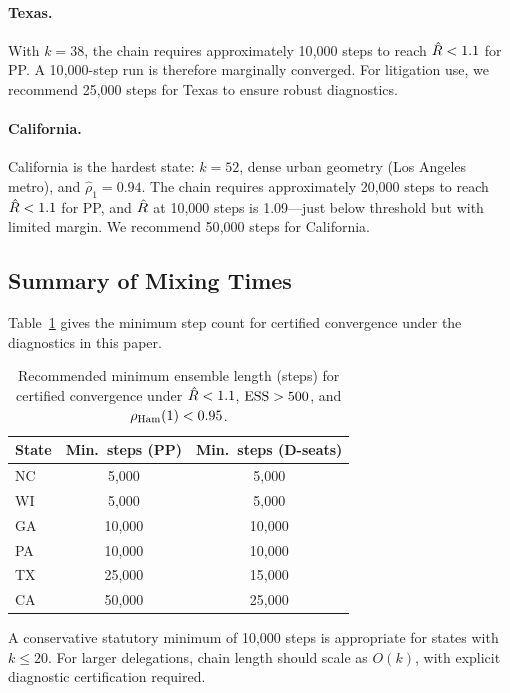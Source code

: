 \paragraph{Texas.}
With $k = 38$, the chain requires approximately 10{,}000 steps to reach
$\hat{R} < 1.1$ for PP.
A 10{,}000-step run is therefore marginally converged.
For litigation use, we recommend 25{,}000 steps for Texas to ensure
robust diagnostics.

\paragraph{California.}
California is the hardest state: $k = 52$, dense urban geometry
(Los Angeles metro), and $\hat{\rho}_1 = 0.94$.
The chain requires approximately 20{,}000 steps to reach $\hat{R} < 1.1$
for PP, and $\hat{R}$ at 10{,}000 steps is 1.09---just below threshold but
with limited margin.
We recommend 50{,}000 steps for California.

\subsection{Summary of Mixing Times}

Table~\ref{tab:mixing-times} gives the minimum step count for certified
convergence under the diagnostics in this paper.

\begin{table}[h]
\centering
\caption{Recommended minimum ensemble length (steps) for certified
         convergence under $\hat{R} < 1.1$, $\mathrm{ESS} > 500$, and $\rho_{\mathrm{Ham}}(1) < 0.95$.}
\label{tab:mixing-times}
\begin{tabular}{lcc}
\toprule
State & Min.\ steps (PP) & Min.\ steps (D-seats) \\
\midrule
NC &  5{,}000 &  5{,}000 \\
WI &  5{,}000 &  5{,}000 \\
GA & 10{,}000 & 10{,}000 \\
PA & 10{,}000 & 10{,}000 \\
TX & 25{,}000 & 15{,}000 \\
CA & 50{,}000 & 25{,}000 \\
\bottomrule
\end{tabular}
\end{table}

A conservative statutory minimum of 10{,}000 steps is appropriate for
states with $k \leq 20$.
For larger delegations, chain length should scale as $O(k)$,
with explicit diagnostic certification required.
